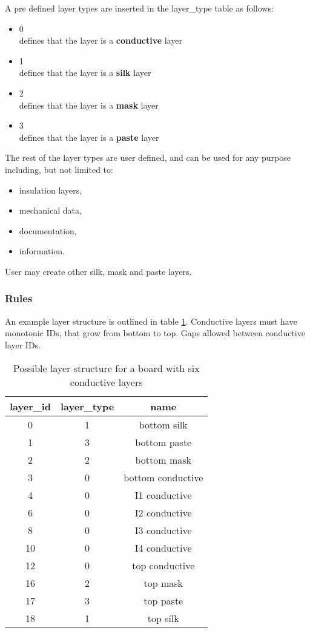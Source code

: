 \documentclass[12pt]{article}
\begin{document}
A pre defined layer types are inserted in the layer\_type table as follows:

\begin{itemize}
\item 0\\defines that the layer is a \textbf{conductive} layer
\item 1\\defines that the layer is a \textbf{silk} layer
\item 2\\defines that the layer is a \textbf{mask} layer
\item 3\\defines that the layer is a \textbf{paste} layer
\end{itemize}

The rest of the layer types are user defined, and can be used for any purpose including, but not
limited to:

\begin{itemize}
\item
  insulation layers,
\item
  mechanical data,
\item
  documentation,
\item
  information.
\end{itemize}

User may create other silk, mask and paste layers.

\subsubsection{Rules}

An example layer structure is outlined in table \ref{tab:layer_struct}.
Conductive layers must have monotonic IDs, that grow from bottom to top. Gaps allowed between conductive
layer IDs.

\begin{table}[htbp]
\centering
\begin{tabular}{|c|c|c|}
\hline
layer\_id&layer\_type&name\\
\hline
\hline
0&1&bottom silk\\
\hline
1&3&bottom paste\\
\hline
2&2&bottom mask\\
\hline
3&0&bottom conductive\\
\hline
4&0&I1 conductive\\
\hline
6&0&I2 conductive\\
\hline
8&0&I3 conductive\\
\hline
10&0&I4 conductive\\
\hline
12&0&top conductive\\
\hline
16&2&top mask\\
\hline
17&3&top paste\\
\hline
18&1&top silk\\
\hline
\end{tabular}
\caption{Possible layer structure for a board with six conductive layers}
\label{tab:layer_struct}
\end{table}
\end{document}
